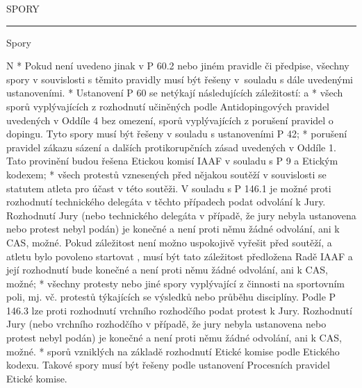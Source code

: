 \chap SPORY

\rule{59}
\secc Spory

\begitems \style N
* Pokud není uvedeno jinak v P 60.2 nebo jiném pravidle či předpise, všechny spory v souvislosti s těmito pravidly musí být řešeny v~souladu s dále uvedenými ustanoveními.
* Ustanovení P 60 se netýkají následujících záležitostí:
  \begitems \style a
  * všech sporů vyplývajících z rozhodnutí učiněných podle Antidopingových pravidel uvedených v Oddíle 4 bez omezení, sporů vyplývajících z porušení pravidel o dopingu. Tyto spory musí být řešeny v souladu s ustanoveními P 42;
  * porušení pravidel zákazu sázení a dalších protikorupčních zásad uvedených v Oddíle 1. Tato provinění budou řešena Etickou komisí IAAF v souladu s P 9 a Etickým kodexem;
  * všech protestů vznesených před nějakou soutěží v souvislosti se statutem atleta pro účast v této soutěži. V souladu s P 146.1 je možné proti rozhodnutí technického delegáta v těchto případech podat odvolání k Jury. Rozhodnutí Jury (nebo technického delegáta v případě, že jury nebyla ustanovena nebo protest nebyl podán) je konečné a není proti němu žádné odvolání, ani k CAS, možné. Pokud záležitost není možno uspokojivě vyřešit před soutěží, a atletu bylo povoleno startovat , musí být tato záležitost předložena Radě IAAF a její rozhodnutí bude konečné a není proti němu žádné odvolání, ani k CAS, možné;
  * všechny protesty nebo jiné spory vyplývající z činnosti na sportovním poli, mj. vč. protestů týkajících se výsledků nebo průběhu disciplíny. Podle P 146.3 lze proti rozhodnutí vrchního rozhodčího podat protest k Jury. Rozhodnutí Jury (nebo vrchního rozhodčího v případě, že jury nebyla ustanovena nebo protest nebyl podán) je konečné a není proti němu žádné odvolání, ani k CAS, možné.
  * sporů vzniklých na základě rozhodnutí Etické komise podle Etického kodexu. Takové spory musí být řešeny podle ustanovení Procesních pravidel Etické komise.
  \enditems

